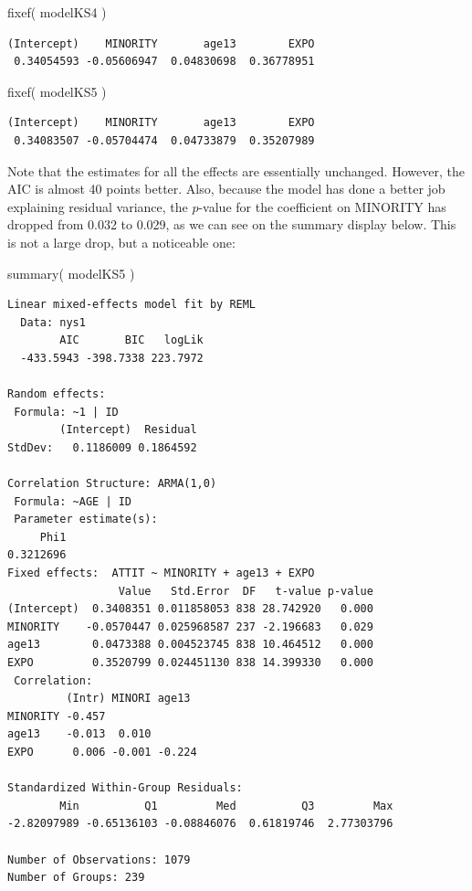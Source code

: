 \documentclass[
  letterpaper,
  DIV=11,
  numbers=noendperiod]{scrreprt}
\newenvironment{Shaded}{}{}
\newcommand{\FunctionTok}[1]{\textcolor[rgb]{0.02,0.16,0.49}{#1}}
\newcommand{\NormalTok}[1]{#1}
\begin{document}
\begin{Shaded}
\begin{Highlighting}[]
\FunctionTok{fixef}\NormalTok{( modelKS4 )}
\end{Highlighting}
\end{Shaded}

\begin{verbatim}
(Intercept)    MINORITY       age13        EXPO 
 0.34054593 -0.05606947  0.04830698  0.36778951 
\end{verbatim}

\begin{Shaded}
\begin{Highlighting}[]
\FunctionTok{fixef}\NormalTok{( modelKS5 )}
\end{Highlighting}
\end{Shaded}

\begin{verbatim}
(Intercept)    MINORITY       age13        EXPO 
 0.34083507 -0.05704474  0.04733879  0.35207989 
\end{verbatim}

Note that the estimates for all the effects are essentially unchanged.
However, the AIC is almost 40 points better. Also, because the model has
done a better job explaining residual variance, the \(p\)-value for the
coefficient on MINORITY has dropped from 0.032 to 0.029, as we can see
on the summary display below. This is not a large drop, but a noticeable
one:

\begin{Shaded}
\begin{Highlighting}[]
\FunctionTok{summary}\NormalTok{( modelKS5 )}
\end{Highlighting}
\end{Shaded}

\begin{verbatim}
Linear mixed-effects model fit by REML
  Data: nys1 
        AIC       BIC   logLik
  -433.5943 -398.7338 223.7972

Random effects:
 Formula: ~1 | ID
        (Intercept)  Residual
StdDev:   0.1186009 0.1864592

Correlation Structure: ARMA(1,0)
 Formula: ~AGE | ID 
 Parameter estimate(s):
     Phi1 
0.3212696 
Fixed effects:  ATTIT ~ MINORITY + age13 + EXPO 
                 Value   Std.Error  DF   t-value p-value
(Intercept)  0.3408351 0.011858053 838 28.742920   0.000
MINORITY    -0.0570447 0.025968587 237 -2.196683   0.029
age13        0.0473388 0.004523745 838 10.464512   0.000
EXPO         0.3520799 0.024451130 838 14.399330   0.000
 Correlation: 
         (Intr) MINORI age13 
MINORITY -0.457              
age13    -0.013  0.010       
EXPO      0.006 -0.001 -0.224

Standardized Within-Group Residuals:
        Min          Q1         Med          Q3         Max 
-2.82097989 -0.65136103 -0.08846076  0.61819746  2.77303796 

Number of Observations: 1079
Number of Groups: 239 
\end{verbatim}
\end{document}
